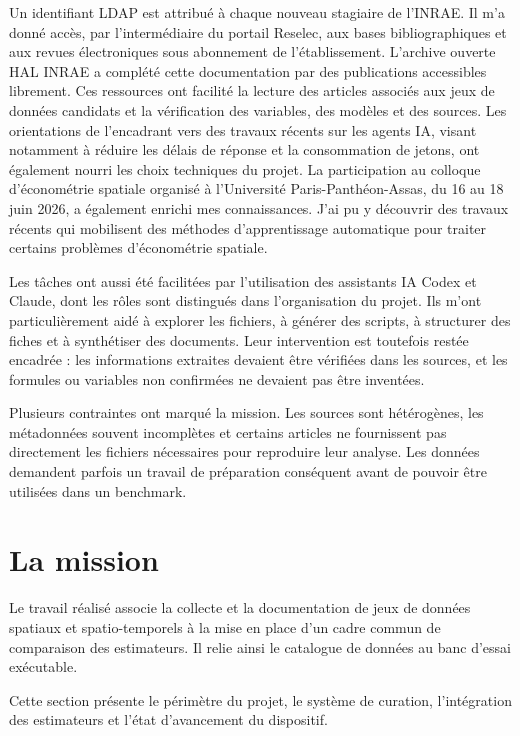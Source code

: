 \documentclass[11pt,a4paper]{article}
\begin{document}
Un identifiant LDAP est attribué à chaque nouveau stagiaire de l'INRAE. Il m'a donné accès, par l'intermédiaire du portail Reselec, aux bases bibliographiques et aux revues électroniques sous abonnement de l'établissement. L'archive ouverte HAL INRAE a complété cette documentation par des publications accessibles librement. Ces ressources ont facilité la lecture des articles associés aux jeux de données candidats et la vérification des variables, des modèles et des sources. Les orientations de l'encadrant vers des travaux récents sur les agents IA, visant notamment à réduire les délais de réponse et la consommation de jetons, ont également nourri les choix techniques du projet. La participation au colloque d'économétrie spatiale organisé à l'Université Paris-Panthéon-Assas, du 16 au 18 juin 2026, a également enrichi mes connaissances. J'ai pu y découvrir des travaux récents qui mobilisent des méthodes d'apprentissage automatique pour traiter certains problèmes d'économétrie spatiale.

Les tâches ont aussi été facilitées par l'utilisation des assistants IA Codex et Claude, dont les rôles sont distingués dans l'organisation du projet. Ils m'ont particulièrement aidé à explorer les fichiers, à générer des scripts, à structurer des fiches et à synthétiser des documents. Leur intervention est toutefois restée encadrée : les informations extraites devaient être vérifiées dans les sources, et les formules ou variables non confirmées ne devaient pas être inventées.

Plusieurs contraintes ont marqué la mission. Les sources sont hétérogènes, les métadonnées souvent incomplètes et certains articles ne fournissent pas directement les fichiers nécessaires pour reproduire leur analyse. Les données demandent parfois un travail de préparation conséquent avant de pouvoir être utilisées dans un benchmark.

\section{La mission}

Le travail réalisé associe la collecte et la documentation de jeux de données spatiaux et spatio-temporels à la mise en place d'un cadre commun de comparaison des estimateurs. Il relie ainsi le catalogue de données au banc d'essai exécutable.

Cette section présente le périmètre du projet, le système de curation, l'intégration des estimateurs et l'état d'avancement du dispositif.
\end{document}

